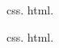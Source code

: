 \documentclass{report}
\begin{document}
\gls{css}. \gls{html}.

\gls{css}. \gls{html}.

\printglossaries
\end{document}

